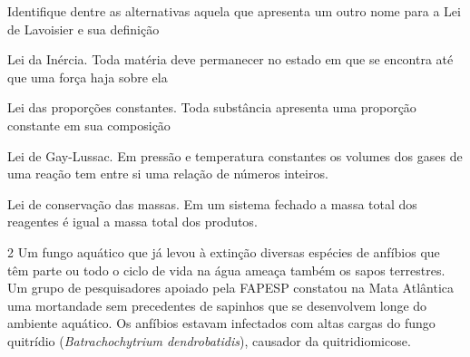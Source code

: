 
Identifique dentre as alternativas aquela que apresenta um outro nome
para a Lei de Lavoisier e sua definição

\begin{escolha}
\item
  Lei da Inércia. Toda matéria deve permanecer no estado em que se
  encontra até que uma força haja sobre ela
\item
  Lei das proporções constantes. Toda substância apresenta uma proporção
  constante em sua composição
\item
  Lei de Gay-Lussac. Em pressão e temperatura constantes os volumes dos
  gases de uma reação tem entre si uma relação de números inteiros.
\item
  Lei de conservação das massas. Em um sistema fechado a massa total dos
  reagentes é igual a massa total dos produtos.
\end{escolha}


\num{2}
  Um fungo aquático que já levou à extinção diversas espécies de
  anfíbios que têm parte ou todo o ciclo de vida na água ameaça também
  os sapos terrestres. Um grupo de pesquisadores apoiado pela FAPESP
  constatou na Mata Atlântica uma mortandade sem precedentes de sapinhos
  que se desenvolvem longe do ambiente aquático. Os anfíbios estavam
  infectados com altas cargas do fungo quitrídio (\emph{Batrachochytrium
  dendrobatidis}), causador da quitridiomicose.


